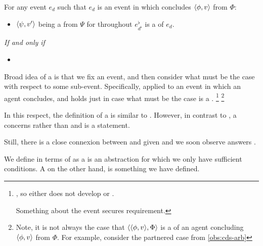 \begin{note}
  \begin{definition}[A \requ{0}]%
    \label{def:requ}%
    For any event \(e_{d}\) such that \(e_{d}\) is an event in which \vAgent{} concludes \(\langle \phi, v \rangle\) from \(\Phi\):
    \begin{itemize}
    \item
      \(\langle \psi, v' \rangle\) being a \fc{} from \(\Psi\) for \vAgent{} throughout \(e^{\flat}_{d^{\flat}}\) is a \emph{\requ{}} of \(e_{d}\).
    \end{itemize}

    \emph{If and only if}

    \begin{itemize}
    \item
    \end{itemize}
    \vspace{-\baselineskip}
  \end{definition}

  \noindent%
  Broad idea of a \requ{} is that we fix an event, and then consider what must be the case with respect to some sub-event.
  Specifically, applied to an event in which an agent concludes, and holds just in case what must be the case is a \fc{}.%
  \footnote{
    , so either does not develop or \fc{}.

    Something about the event secures requirement.
  }%
  \footnote{
    Note, it is not always the case that \(\langle \langle \phi, v \rangle, \Phi \rangle\) is a \requ{} of an agent concluding \(\langle \phi, v \rangle\) from \(\Phi\).
    For example, consider the partnered case from \autoref{obs:cds-arb}
  }

  In this respect, the definition of a \requ{} is similar to \qWhy{}.
  However, in contrast to \qWhy{}, a \requ{} concerns  rather than  and is a statement.

  Still, there is a close connexion between  and \ros{} given \supportII{} and we soon observe \ros{} answers \qWhy{}.

  We define \requ{} in terms of  as a \ros{} is an abstraction for which we only have sufficient conditions.
  A \fc{} on the other hand, is something we have defined.
\end{note}

